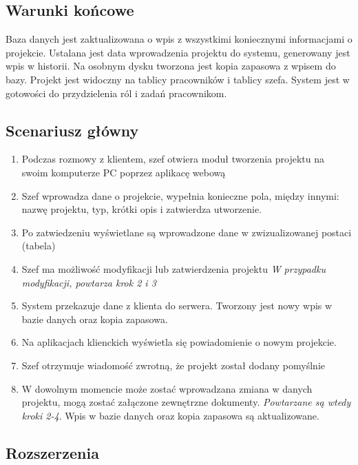 \documentclass{article}
\begin{document}
\subsection{Warunki końcowe}
Baza danych jest zaktualizowana o wpis z wszystkimi koniecznymi informacjami o projekcie. Ustalana 
jest data wprowadzenia projektu do systemu, generowany jest wpis w historii. Na osobnym dysku tworzona jest
kopia zapasowa z wpisem do bazy. Projekt jest widoczny na tablicy pracowników i tablicy szefa. System jest w 
gotowości do przydzielenia ról i zadań pracownikom. 

\subsection{Scenariusz główny}
\begin{enumerate}
    \item Podczas rozmowy z klientem, szef otwiera moduł tworzenia projektu na swoim komputerze PC poprzez aplikacę webową
    \item Szef wprowadza dane o projekcie, wypełnia konieczne pola, między innymi: nazwę projektu, typ, krótki opis i zatwierdza utworzenie.
    \item Po zatwiedzeniu wyświetlane są wprowadzone dane w zwizualizowanej postaci (tabela)
    \item Szef ma możliwość modyfikacji lub zatwierdzenia projektu \newline \textit{W przypadku modyfikacji, powtarza krok 2 i 3}
    \item System przekazuje dane z klienta do serwera. Tworzony jest nowy wpis w bazie danych oraz kopia zapasowa.
    \item Na aplikacjach klienckich wyświetla się powiadomienie o nowym projekcie.
    \item Szef otrzymuje wiadomość zwrotną, że projekt został dodany pomyślnie
    \item W dowolnym momencie może zostać wprowadzana zmiana w danych projektu, mogą zostać załączone zewnętrzne dokumenty. \textit{Powtarzane są wtedy kroki 2-4}. Wpis w bazie danych oraz kopia zapasowa są aktualizowane.
\end{enumerate}

\subsection{Rozszerzenia}
\end{document}
